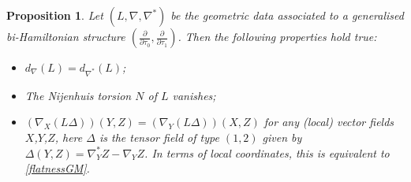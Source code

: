 \documentclass[11pt,a4paper]{amsart}
\numberwithin{equation}{section}
\newtheorem{proposition}[theorem]{Proposition}
\newcommand{\diff}[2]{\frac{\partial #1}{\partial #2}}
\newcommand{\qt}{\tau}
\newcommand{\Qd}{\Delta}
\numberwithin{equation}{section}
\begin{document}
\begin{proposition}
  \label{BY}
  Let $(L,\nabla,\nabla^*)$ be the geometric data associated to a generalised bi-Hamiltonian structure $(\diff{}{\qt_0},\diff{}{\qt_1})$. Then the following properties hold true:
\begin{itemize}
  \item[(1)]$d_\nabla(L) = d_{\nabla^*}(L)$;
  \item[(2)] The Nijenhuis torsion $N$ of $L$ vanishes;
  \item[(3)] $(\nabla_X (L\Qd))(Y,Z) = (\nabla_Y (L\Qd))(X,Z)$ for any (local) vector fields $X$,$Y$,$Z$, here $\Qd$ is the tensor field of type $(1,2)$ given by $\Qd(Y,Z) = \nabla^*_YZ-\nabla_YZ$. In terms of  local coordinates, this is equivalent to \eqref{flatnessGM}.
\end{itemize}
\end{proposition}
\end{document}
